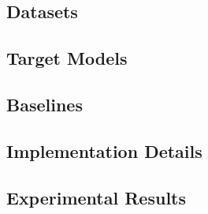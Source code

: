 \subsection{Datasets}

\subsection{Target Models}

\subsection{Baselines}

\subsection{Implementation Details}


\subsection{Experimental Results}
